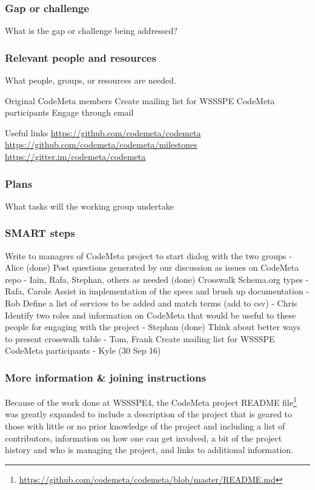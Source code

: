 \subsubsection{Gap or challenge}

What is the gap or challenge being addressed?

\subsubsection{Relevant people and resources}

What people, groups, or resources are needed.

Original CodeMeta members
Create mailing list for WSSSPE CodeMeta participants
Engage through email

Useful links
\url{https://github.com/codemeta/codemeta}
\url{https://github.com/codemeta/codemeta/milestones}
\url{https://gitter.im/codemeta/codemeta}

\subsubsection{Plans}

What tasks will the working group undertake

\subsubsection{SMART steps}

Write to managers of CodeMeta project to start dialog with the two groups - Alice (done)
Post questions generated by our discussion as issues on CodeMeta repo - Iain, Rafa, Stephan, others as needed (done)
Crosswalk Schema.org types - Rafa, Carole
Assist in implementation of the specs and brush up documentation - Rob
Define a list of services to be added and match terms (add to csv) - Chris
Identify two roles and information on CodeMeta that would be useful to these people for engaging with the project - Stephan (done)
Think about better ways to present crosswalk table - Tom, Frank
Create mailing list for WSSSPE CodeMeta participants - Kyle (30 Sep 16)


\subsubsection{More information \& joining instructions}

Because of the work done at WSSSPE4, the CodeMeta project README file\footnote{\url{https://github.com/codemeta/codemeta/blob/master/README.md}} was greatly expanded to include a description of the project that is geared to those with little or no prior knowledge of the project and including a list of contributors, information on how one can get involved, a bit of the project history and who is managing the project, and links to additional information. 
